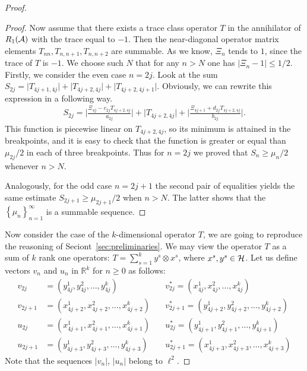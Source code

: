 \begin{proof}
\begin{proof}
        Now assume that there exists a trace class operator $T$ in the annihilator of $R_1(\cal{A})$ with the trace equal to $-1$.
        Then the near-diagonal operator matrix elements $T_{nn}, T_{n, n+1}, T_{n, n+2}$ are summable.
        As we know, $\Xi_n$ tends to $1$, since the trace of $T$ is $-1$.
        We choose such $N$ that for any $n > N$ one has $\lvert \Xi_n - 1 \rvert \leq 1/2$.
        Firstly, we consider the even case $n = 2j$.
        Look at the sum $S_{2j} = \lvert T_{4j+1, 4j} \rvert + \lvert T_{4j+2,4j} \rvert + \lvert T_{4j+2,4j+1}\rvert$.
        Obviously, we can rewrite this expression in a following way.
        \begin{align*}
          S_{2j} = \Big\lvert \frac{\Xi_{4j} - c_{2j} T_{4j+2, 4j}}{a_{2j}} \Big\rvert +
                   \Big\lvert T_{4j+2, 4j} \Big\rvert +
                   \Big\lvert \frac{\Xi_{4j+1} + d_{2j} T_{4j+2, 4j}}{b_{2j}} \Big\rvert.
        \end{align*}
        This function is piecewise linear on $T_{4j+2, 4j}$, so its minimum is attained in the breakpoints, and
          it is easy to check that the function is greater or equal than $\mu_{2j}/2$ in each of three breakpoints.
        Thus for $n=2j$ we proved that $S_n \geq \mu_n/2$ whenever $n > N$.

        Analogously, for the odd case $n = 2j+1$ the second pair of equalities yields
          the same estimate $S_{2j+1} \geq \mu_{2j+1}/2$ when $n > N$.
        The latter shows that the $\left\{\mu_n\right\}_{n=1}^\infty$ is a summable sequence.
      \end{proof}
      Now consider the case of the $k$-dimensional operator $T$, we are going to reproduce the reasoning of Seciont~\ref{sec:preliminaries}.
      We may view the operator $T$ as a sum of $k$ rank one operators: $T = \sum_{s=1}^k y^s \otimes x^s$, where $x^s, y^s \in \cal{H}$.
      Let us define vectors $v_n$ and $u_n$ in $\mathbb{R}^k$ for $n \geq 0 $ as follows:
      \begin{align*}
        v_{2j} &= (y^1_{4j}, y^2_{4j}, \dots ,y^k_{4j}) \quad
        &v^*_{2j} = (x^1_{4j}, x^2_{4j}, \dots ,x^k_{4j}) \\
        v_{2j+1} &= (x^1_{4j+2}, x^2_{4j+2}, \dots ,x^k_{4j+2}) \quad
        &v^*_{2j+1} = (y^1_{4j+2}, y^2_{4j+2}, \dots ,y^k_{4j+2}) \\
        u_{2j} &= (x^1_{4j+1}, x^2_{4j+1}, \dots ,x^k_{4j+1}) \quad
        &u^*_{2j} = (y^1_{4j+1}, y^2_{4j+1}, \dots ,y^k_{4j+1}) \\
        u_{2j+1} &= (y^1_{4j+3}, y^2_{4j+3}, \dots ,y^k_{4j+3}) \quad
        &u^*_{2j+1} = (x^1_{4j+3}, x^2_{4j+3}, \dots ,x^k_{4j+3})
      \end{align*}
      Note that the sequences $\lvert v_n \rvert$, $\lvert u_n \rvert$ belong to $\ell^2$.


\end{proof}
